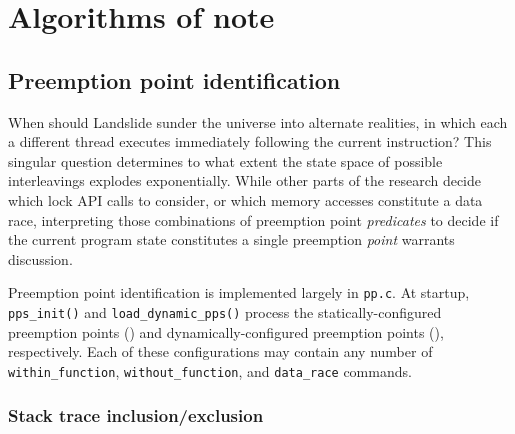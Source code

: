 
\section{Algorithms of note}



\subsection{Preemption point identification}
\label{sec:landslide-pps}

When should Landslide sunder the universe into alternate realities,
in which each a different thread executes immediately following the current instruction?
This singular question determines to what extent the state space of possible interleavings explodes exponentially.
While other parts of the research decide which lock API calls to consider,
or which memory accesses constitute a data race,
interpreting those combinations of preemption point {\em predicates}
to decide if the current program state constitutes a single preemption {\em point}
warrants discussion.

Preemption point identification is implemented largely in {\tt pp.c}.
At startup, {\tt pps\_init()} and {\tt load\_dynamic\_pps()} process the
statically-configured preemption points (\sect{\ref{sec:landslide-staticconfig}})
and dynamically-configured preemption points (\sect{\ref{sec:landslide-dynamicconfig}}),
respectively.
Each of these configurations may contain any number of
{\tt within\_function}, {\tt without\_function}, and {\tt data\_\allowbreak{}race} commands.

\subsubsection{Stack trace inclusion/exclusion}

